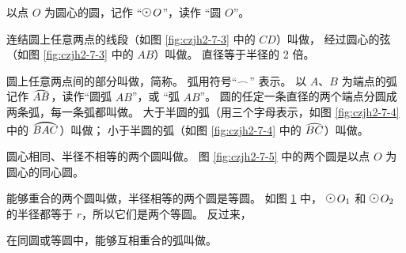 以点 $O$ 为圆心的圆，记作 “$\yuan \, O$”，读作 “圆 $O$”。

连结圆上任意两点的线段（如图 \ref{fig:czjh2-7-3} 中的 $CD$）叫做，
经过圆心的弦（如图 \ref{fig:czjh2-7-3} 中的 $AB$）叫做。
直径等于半径的 2 倍。


圆上任意两点间的部分叫做，简称。
弧用符号“$\yuanhu{\hspace{1em}}$” 表示。
以 $A$、$B$ 为端点的弧记作 $\yuanhu{AB}$，读作“圆弧 $AB$”，或 “弧 $AB$”。
圆的任定一条直径的两个端点分圆成两条弧，每一条弧都叫做。
大于半圆的弧（用三个字母表示，如图 \ref{fig:czjh2-7-4} 中的 $\yuanhu{BAC}$）叫做；
小于半圆的弧（如图 \ref{fig:czjh2-7-4} 中的 $\yuanhu{BC}$）叫做。

圆心相同、半径不相等的两个圆叫做。
图 \ref{fig:czjh2-7-5} 中的两个圆是以点 $O$ 为圆心的同心圆。

\begin{figure}[htbp]
    \centering
    \begin{minipage}[b]{4cm}
        \centering
        
        \caption{}\label{fig:czjh2-7-4}
    \end{minipage}
    \qquad
    \begin{minipage}[b]{4cm}
        \centering
        
        \caption{}\label{fig:czjh2-7-5}
    \end{minipage}
    \qquad
    \begin{minipage}[b]{5cm}
        \centering
        
        \caption{}\label{fig:czjh2-7-6}
    \end{minipage}
\end{figure}


能够重合的两个圆叫做，半径相等的两个圆是等圆。
如图 \ref{fig:czjh2-7-6} 中， $\yuan \, O_1$ 和 $\yuan \, O_2$ 的半径都等于 $r$，所以它们是两个等圆。
反过来，

在同圆或等圆中，能够互相重合的弧叫做。


